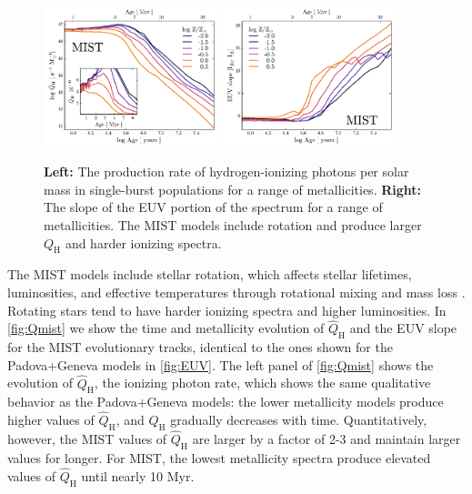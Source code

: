 \documentclass[twocolumn, tighten]{aastex61}
\newcommand{\Fig}[1]{\autoref{fig:#1}}
\newcommand{\QH}{\ensuremath{Q_{\mathrm{H}}}}
\newcommand{\QHat}{\ensuremath{\hat{Q}_{\mathrm{H}}}}
\begin{document}
\begin{figure}
  \begin{centering}
    \includegraphics[width=0.45\textwidth]{f21a.pdf}
    \includegraphics[width=0.45\textwidth]{f21b.pdf}
    \caption{\textbf{Left:} The production rate of hydrogen-ionizing photons per solar mass in single-burst populations for a range of metallicities. \textbf{Right:} The slope of the EUV portion of the spectrum for a range of metallicities. The MIST models include rotation and produce larger \QH{} and harder ionizing spectra.}
    \label{fig:Qmist}
  \end{centering}
\end{figure}

The MIST models include stellar rotation, which affects stellar lifetimes, luminosities, and effective temperatures through rotational mixing and mass loss \citep[][for further details]{Choi16}. Rotating stars tend to have harder ionizing spectra and higher luminosities. In \Fig{Qmist} we show the time and metallicity evolution of \QHat{} and the EUV slope for the MIST evolutionary tracks, identical to the ones shown for the Padova+Geneva models in \Fig{EUV}. The left panel of \Fig{Qmist} shows the evolution of \QHat{}, the ionizing photon rate, which shows the same qualitative behavior as the Padova+Geneva models: the lower metallicity models produce higher values of \QHat{}, and \QHat{} gradually decreases with time. Quantitatively, however, the MIST values of \QHat{} are larger by a factor of 2-3 and maintain larger values for longer. For MIST, the lowest metallicity spectra produce elevated values of \QHat{} until nearly 10 Myr. 
\end{document}
